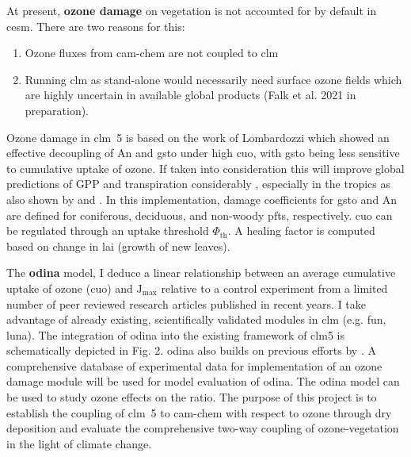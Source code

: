 At present, \textbf{ozone damage} on vegetation is not accounted for by default in \gls{cesm}. There are two reasons for this: 
\begin{enumerate}
  \itemsep0em
\item Ozone fluxes from \gls{cam}-chem are not coupled to \gls{clm} 
\item Running \gls{clm} as stand-alone would necessarily need surface ozone fields which are highly uncertain in available global products (Falk et al. 2021 in preparation).
\end{enumerate}
Ozone damage in \gls{clm}~5 is based on the work of Lombardozzi \parencite{Oe:Lombardozzi2012} which showed an effective decoupling of An and gsto under high \gls{cuo}, with gsto being less sensitive to cumulative uptake of ozone. If taken into consideration this will improve global predictions of GPP and transpiration considerably \parencite{BGS:Lombardozzi2012}, especially in the tropics as also shown by \textcite{ACP:Pacifico2015} and \textcite{ACP:Pacifico2015}. In this implementation, damage coefficients for gsto and An are defined for coniferous, deciduous, and non-woody \glspl{pft}, respectively. \gls{cuo} can be regulated through an uptake threshold $\Phi_\mathrm{th}$. A healing factor is computed based on change in \gls{lai} (growth of new leaves).

The \textbf{\gls{odina}} model, I deduce a linear relationship between an average cumulative uptake of ozone (\gls{cuo}) and $\mathrm{J_{max}}$ relative to a control experiment from a limited number of peer reviewed research articles published in recent years. I take advantage of already existing, scientifically validated modules in \gls{clm} (e.g. \gls{fun}, \gls{luna}). The integration of \gls{odina} into the existing framework of \gls{clm}5 is schematically depicted in Fig. 2. \gls{odina} also builds on previous efforts by \textcites{BGS:Lombardozzi2012}{Oe:Lombardozzi2012}. A comprehensive database of experimental data for implementation of an ozone damage module \parencite{BGS:Lombardozzi2013} will be used for model evaluation of \gls{odina}. The \gls{odina} model can be used to study ozone effects on the  ratio. The purpose of this project is to establish the coupling of \gls{clm}~5 to \gls{cam}-chem with respect to ozone through dry deposition and evaluate the comprehensive two-way coupling of ozone-vegetation in the light of climate change.
